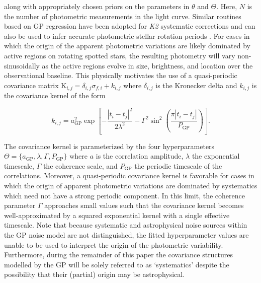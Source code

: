 \noindent along with appropriately chosen priors on the parameters in $\theta$ and $\Theta$.
Here, $N$ is the number of photometric measurements in the light curve. Similar routines based on GP regression 
have been adopted for \emph{K2} systematic corrections \citep[e.g.][]{aigrain15,crossfield15,aigrain16} 
and can also be used to infer accurate photometric stellar rotation periods \citep{angus18}. For cases in which
the origin of the apparent photometric variations are likely dominated by active regions on rotating spotted
stars, the resulting photometry will vary non-sinusoidally as the active regions 
evolve in size, brightness, and location over the observational baseline. This physically motivates the
use of a quasi-periodic covariance matrix K$_{i,j} = \delta_{i,j} \sigma_{f,i} + k_{i,j}$ where $\delta_{i,j}$
is the Kronecker delta and $k_{i,j}$ is the covariance kernel of the form

\begin{equation}
  k_{i,j} = a_{\text{GP}}^2 \exp{\left[ - \frac{|t_i-t_j|^2}{2\lambda^2} -\Gamma^2
      \sin^2{\left(\frac{\pi|t_i-t_j|}{P_{\text{GP}}} \right)} \right]}.
\end{equation}

\noindent The covariance kernel is parameterized by the four hyperparameters
$\Theta=\{a_{\text{GP}},\lambda,\Gamma,P_{\text{GP}}\}$ where
$a$ is the correlation amplitude, $\lambda$ the exponential timescale, $\Gamma$ the coherence scale,
and $P_{\text{GP}}$ the periodic timescale of the correlations. Moreover,
a quasi-periodic covariance kernel is favorable for cases in which the origin of
apparent photometric variations are dominated by systematics which need not have a strong periodic
component. In this limit, the coherence parameter $\Gamma$ approaches small values such
that the covariance kernel becomes well-approximated by a squared exponential kernel with a single
effective timescale. Note that because 
systematic and astrophysical noise sources within the GP noise model are not distinguished,
the fitted hyperparameter values are unable to be used to interpret the origin of the photometric
variability. Furthermore, during the remainder of this paper the covariance structures modelled by the
GP will be solely referred to as `systematics' despite the possibility that their (partial) origin may
be astrophysical.

